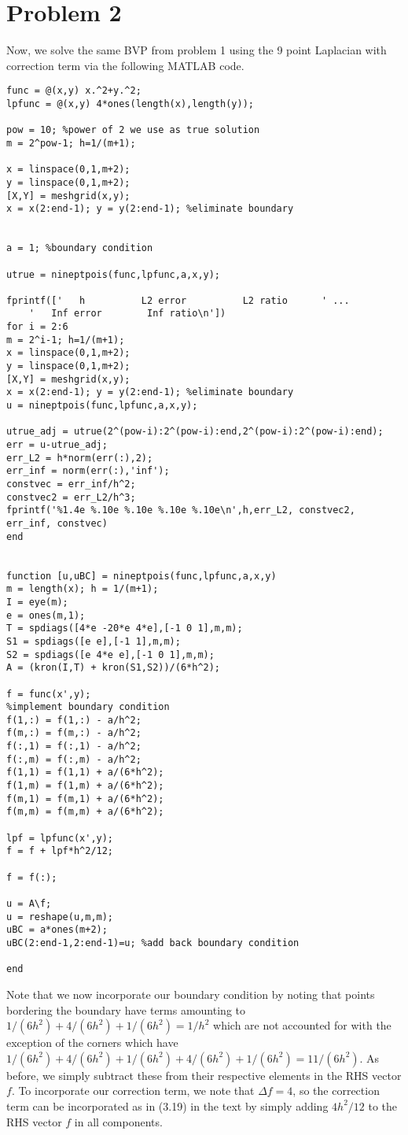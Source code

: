 \documentclass{article}
\begin{document}
\section{Problem 2}
Now, we solve the same BVP from problem 1 using the 9 point Laplacian with correction term via the following MATLAB code.
\begin{verbatim}
func = @(x,y) x.^2+y.^2;
lpfunc = @(x,y) 4*ones(length(x),length(y));

pow = 10; %power of 2 we use as true solution
m = 2^pow-1; h=1/(m+1);

x = linspace(0,1,m+2);
y = linspace(0,1,m+2);
[X,Y] = meshgrid(x,y);
x = x(2:end-1); y = y(2:end-1); %eliminate boundary


a = 1; %boundary condition

utrue = nineptpois(func,lpfunc,a,x,y); 

fprintf(['   h          L2 error          L2 ratio      ' ...
    '   Inf error        Inf ratio\n'])
for i = 2:6
m = 2^i-1; h=1/(m+1);
x = linspace(0,1,m+2);
y = linspace(0,1,m+2);
[X,Y] = meshgrid(x,y);
x = x(2:end-1); y = y(2:end-1); %eliminate boundary
u = nineptpois(func,lpfunc,a,x,y); 

utrue_adj = utrue(2^(pow-i):2^(pow-i):end,2^(pow-i):2^(pow-i):end);
err = u-utrue_adj;
err_L2 = h*norm(err(:),2);
err_inf = norm(err(:),'inf');
constvec = err_inf/h^2;
constvec2 = err_L2/h^3;
fprintf('%1.4e %.10e %.10e %.10e %.10e\n',h,err_L2, constvec2, err_inf, constvec)
end


function [u,uBC] = nineptpois(func,lpfunc,a,x,y)
m = length(x); h = 1/(m+1);
I = eye(m);
e = ones(m,1);
T = spdiags([4*e -20*e 4*e],[-1 0 1],m,m);
S1 = spdiags([e e],[-1 1],m,m);
S2 = spdiags([e 4*e e],[-1 0 1],m,m);
A = (kron(I,T) + kron(S1,S2))/(6*h^2);

f = func(x',y); 
%implement boundary condition
f(1,:) = f(1,:) - a/h^2;
f(m,:) = f(m,:) - a/h^2;
f(:,1) = f(:,1) - a/h^2;
f(:,m) = f(:,m) - a/h^2;
f(1,1) = f(1,1) + a/(6*h^2);
f(1,m) = f(1,m) + a/(6*h^2);
f(m,1) = f(m,1) + a/(6*h^2);
f(m,m) = f(m,m) + a/(6*h^2);

lpf = lpfunc(x',y);
f = f + lpf*h^2/12;

f = f(:);

u = A\f;
u = reshape(u,m,m);
uBC = a*ones(m+2);
uBC(2:end-1,2:end-1)=u; %add back boundary condition

end
\end{verbatim}
Note that we now incorporate our boundary condition by noting that points bordering the boundary have terms amounting to $1/(6h^2)+4/(6h^2)+1/(6h^2)=1/h^2$ which are not accounted for with the exception of the corners which have $1/(6h^2)+4/(6h^2)+1/(6h^2)+4/(6h^2)+1/(6h^2)=11/(6h^2)$. As before, we simply subtract these from their respective elements in the RHS vector $f$. To incorporate our correction term, we note that $\Delta f=4$, so the correction term can be incorporated as in (3.19) in the text by simply adding $4h^2/12$ to the RHS vector $f$ in all components.\\
\end{document}

